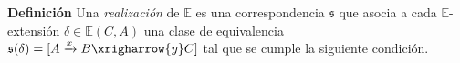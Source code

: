 \documentclass[preview]{standalone}
\begin{document}
\begin{center}
\textbf{Definición} Una \emph{realización} de $\mathbb{E}$ es una correspondencia $\mathfrak{s}$ que asocia a cada $\mathbb{E}$-extensión $\delta\in\mathbb{E}(C,A)$ una clase de equivalencia $\mathfrak{s}(\delta) = [A\xrightarrow{x}B\xrigharrow{y}C]$ tal que se cumple la siguiente condición.
\end{center}
\end{document}
